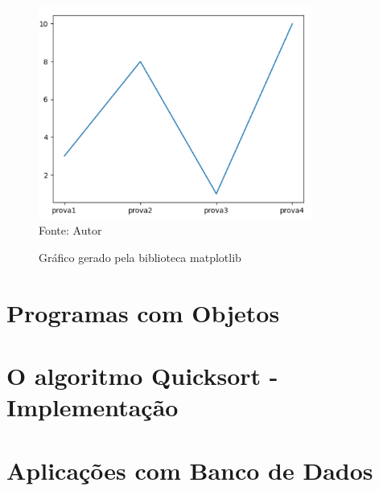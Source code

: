  \begin{figure}[H]
  	\begin{center}
  		\caption{Gráfico gerado pela biblioteca matplotlib} \label{ling1}
  		\includegraphics[width=9cm]{grafico py.PNG} \\
  		{\tiny \sf Fonte:{ Autor}}
  	\end{center}
  \end{figure}
  
    \section{Programas com Objetos}


    \section{O algoritmo Quicksort - Implementa\c{c}\~{a}o}


    \section{Aplica\c{c}\~{o}es com Banco de Dados}

